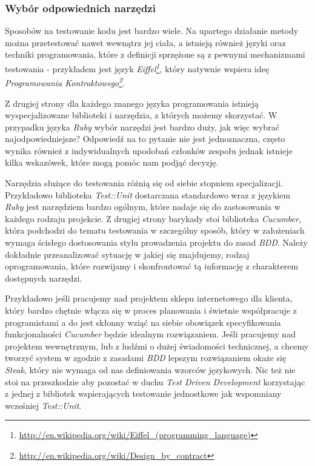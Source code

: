   \subsubsection{Wybór odpowiednich narzędzi}
  Sposobów na testowanie kodu jest bardzo wiele. Na upartego działanie metody można przetestować nawet wewnątrz jej ciała, a istnieją również języki oraz techniki programowania, które z definicji sprzężone są z pewnymi mechanizmami testowania - przykładem jest język \emph{Eiffel\footnote{\url{http://en.wikipedia.org/wiki/Eiffel_(programming_language)}}}, który natywnie wspiera ideę \emph{Programowania Kontraktowego\footnote{\url{http://en.wikipedia.org/wiki/Design_by_contract}}}.
  
  Z drugiej strony dla każdego znanego języka programowania istnieją wyspecjalizowane biblioteki i narzędzia, z których możemy skorzystać. W przypadku języka \emph{Ruby} wybór narzędzi jest bardzo duży, jak więc wybrać najodpowiedniejsze? Odpowiedź na to pytanie nie jest jednoznaczna, często wynika również z indywidualnych upodobań członków zespołu jednak istnieje kilka wskazówek, które mogą pomóc nam podjąć decyzję.
  
  Narzędzia służące do testowania różnią się od siebie stopniem specjalizacji. Przykładowo biblioteka \emph{Test::Unit} dostarczana standardowo wraz z językiem \emph{Ruby} jest narzędziem bardzo ogólnym, które nadaje się do zastosowania w każdego rodzaju projekcie. Z drugiej strony barykady stoi biblioteka \emph{Cucumber}, która podchodzi do tematu testowania w szczególny sposób, który w założeniach wymaga ścisłego dostosowania stylu prowadzenia projektu do zasad \emph{BDD}. Należy dokładnie przeanalizować sytuację w jakiej się znajdujemy, rodzaj oprogramowania, które rozwijamy i skonfrontować tą informację z charakterem dostępnych narzędzi. 
  
  Przykładowo jeśli pracujemy nad projektem sklepu internetowego dla klienta, który bardzo chętnie włącza się w proces planowania i świetnie współpracuje z programistami a do jest skłonny wziąć na siebie obowiązek specyfikowania funkcjonalności \emph{Cucumber} będzie idealnym rozwiązaniem. Jeśli pracujemy nad projektem wewnętrznym, lub z ludźmi o dużej świadomości technicznej, a chcemy tworzyć system w zgodzie z zasadami \emph{BDD} lepszym rozwiązaniem okaże się \emph{Steak}, który nie wymaga od nas definiowania wzorców językowych. Nic też nie stoi na przeszkodzie aby pozostać w duchu \emph{Test Driven Development} korzystając z jednej z bibliotek wspierających testowanie jednostkowe jak wspomniany wcześniej \emph{Test::Unit}.
  
